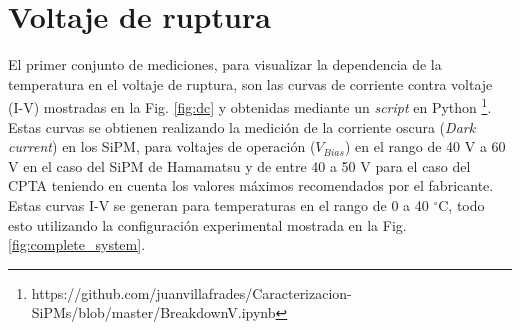 \section{Voltaje de ruptura}
El primer conjunto de mediciones, para visualizar la dependencia de la temperatura en el voltaje de ruptura, son las curvas de corriente contra voltaje (I-V) mostradas en la Fig. \ref{fig:dc} y obtenidas mediante un \textit{script} en Python \footnote{https://github.com/juanvillafrades/Caracterizacion-SiPMs/blob/master/BreakdownV.ipynb}. Estas curvas se obtienen realizando la medición de la corriente oscura (\textit{Dark current}) en los SiPM, para voltajes de operación ($V_{Bias}$) en el rango de 40 V a 60 V en el caso del SiPM de Hamamatsu y de entre 40 a 50 V para el caso del CPTA teniendo en cuenta los valores máximos recomendados por el fabricante. Estas curvas I-V se generan para temperaturas en el rango de 0 a 40 $^\circ$C, todo esto utilizando la configuración experimental mostrada en la Fig. \ref{fig:complete_system}.
